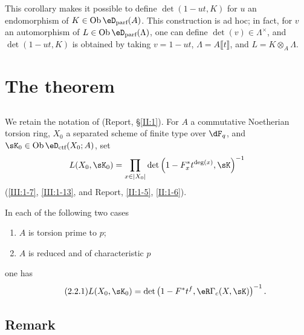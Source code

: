This corollary makes it possible to define $\det(1-u t,K)$ for $u$ an
endomorphism of $K\in \ob\eD_\text{parf}(A)$. This construction is ad hoc; in
fact, for $v$ an automorphism of $L\in\ob\eD_\text{parf}(\Lambda)$, one can
define $\det(v)\in\Lambda^\times$, and $\det(1-u t,K)$ is obtained by taking
$v=1-u t$, $\Lambda=A\llbracket t\rrbracket$, and
$L=K\otimes_A\Lambda$.









\section{The theorem}\label{III:2}






\subsection{}\label{III:2-1}

We retain the notation of (Report, \S\ref{II:1}). For $A$ a commutative
Noetherian torsion ring, $X_0$ a separated scheme of finite type over
$\dF_q$, and $\sK_0\in\ob\eD_\text{ctf}(X_0;A)$, set
\[
  L(X_0,\sK_0) = \prod_{x\in |X_0|} \det\left(1-F_x^* t^{\deg(x)}, \sK\right)^{-1}
\]
(\ref{III:1-7}, \ref{III:1-13}, and Report, \ref{II:1-5}, \ref{II:1-6}).





\begin{theorem_}\label{III:2-2}
In each of the following two cases
\begin{enumerate}[\indent a)]
  \item $A$ is torsion prime to $p$;
  \item $A$ is reduced and of characteristic $p$
\end{enumerate}
one has
\begin{equation*}\tag{2.2.1}\label{III:eq:2-2-1}
  L(X_0,\sK_0) = \det\left(1-F^* t^f, \eR\Gamma_c(X,\sK)\right)^{-1} \text{.}
\end{equation*}
\end{theorem_}






\subsection{Remark}\label{III:2-3}

